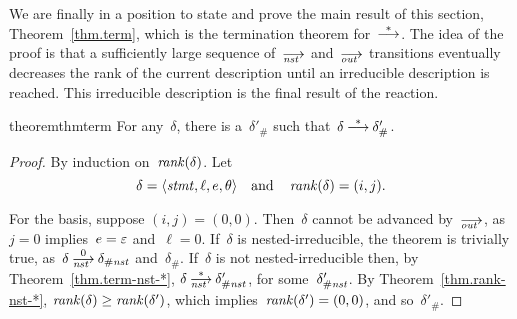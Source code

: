 We are finally in a position to state and prove the main result of this
section, Theorem~\ref{thm.term}, which is the termination theorem
for~$\trans[*]$.  The idea of the proof is that a sufficiently large
sequence of~$\nst$ and~$\out$ transitions eventually decreases the rank of
the current description until an irreducible description is reached.  This
irreducible description is the final result of the reaction.
\begin{restatable}[Termination]{theorem}{thmterm}
  \label{thm.term}
  For any~$\delta$, there is a~$\delta'_\#$ such
  that~$\delta\trans[*]\delta'_\#$.
\end{restatable}
\begin{proof}
  By induction on~$\operatorname{\mathit{rank}}(\delta)$.
  Let
  \[
    \delta=\<\stmt,\ell,e,\theta>
    \quad\text{and}\quad
    \rank(\delta)=(i,j).
  \]

  For the basis, suppose $(i,j)=(0,0)$.  Then~$\delta$ cannot be advanced
  by~$\out$, as~$j=0$ implies~$e=\varepsilon$ and~$\ell=0$.  If~$\delta$ is
  nested-irreducible, the theorem is trivially true,
  as~$\delta\nst[0]\delta_\Hnst$ and~$\delta_\#$.  If~$\delta$ is not
  nested-irreducible then, by Theorem~\ref{thm.term-nst-*},
  $\delta\nst[*]\delta'_\Hnst$, for some~$\delta'_{\#\mathit{nst}}$.  By
  Theorem~\ref{thm.rank-nst-*}, $\operatorname{\mathit{rank}}(\delta)\ge\operatorname{\mathit{rank}}(\delta')$, which
  implies~$\operatorname{\mathit{rank}}(\delta')=(0,0)$, and so~$\delta'_\#$.


\end{proof}
